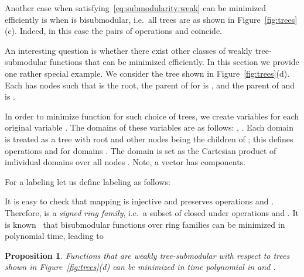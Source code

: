\documentclass[11pt,onecolumn]{article}
\newtheorem{proposition}[theorem]{Proposition}
\begin{document}
Another case when  satisfying~\eqref{eq:submodularity:weak} can be minimized efficiently is when  is bisubmodular, i.e.\ all trees
are as shown in Figure~\ref{fig:trees}(c). Indeed, in this case the pairs of operations  and  coincide.

An interesting question is whether there exist other classes of weakly tree-submodular functions that
can be minimized efficiently. In this section we provide one rather special example. We consider the tree shown in
Figure~\ref{fig:trees}(d). Each  has nodes  such that  is the root, the parent of
 for  is , and the parent of  and  is . 

In order to minimize function  for such choice of trees, we create  variables  for
each original variable . The domains of these variables are as follows:
, . Each domain 
is treated as a tree with root  and other nodes being the children of ; this defines operations  and 
for domains . The domain  is set as the Cartesian product of individual
domains over all nodes . Note, a vector  has  components.

For a labeling  let us define labeling  as follows:

\ignore{

}
It is easy to check that mapping  is injective and preserves operations  and .
Therefore,  is a {\em signed ring family}, i.e.\ a subset of  closed under operations  and .
It is known~\cite{McCormick:10} that bisubmodular functions over ring families can be minimized in polynomial time, leading to
\begin{proposition}
Functions that are weakly tree-submodular with respect to trees shown in Figure~\ref{fig:trees}(d) can be minimized
in time polynomial in  and .
\end{proposition}
\end{document}

